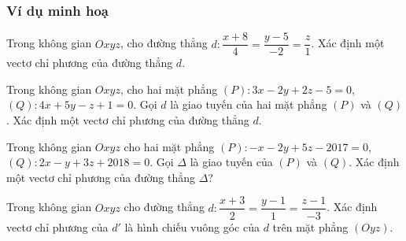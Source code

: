 	\subsubsection{Ví dụ minh hoạ}
	\begin{vd}%
	Trong không gian $Oxyz$, cho đường thẳng $d:\dfrac{x+8}{4}=\dfrac{y-5}{-2}=\dfrac{z}{1}$. Xác định một vectơ chỉ phương của đường thẳng $d$.
	\end{vd}
	\begin{vd}%
	Trong không gian $Oxyz$, cho hai mặt phẳng $(P): 3x-2y+2z-5=0$, $(Q): 4x+5y-z+1=0$. Gọi $ d $ là giao tuyến của hai mặt phẳng $(P)$ và $(Q)$. Xác định một vectơ chỉ phương của đường thẳng $d$.
	\end{vd}
	\begin{vd}%
	Trong không gian $Oxyz$ cho hai mặt phẳng $(P)\colon -x-2y+5z-2017=0$, $(Q)\colon 2x-y+3z+2018=0$. Gọi $\Delta$ là giao tuyến của $(P)$ và $(Q)$. Xác định một vectơ chỉ phương của đường thẳng $\Delta$?
	\end{vd}
	\begin{vd}%
	Trong không gian $Oxyz$ cho đường thẳng $d \colon \dfrac{x+3}{2} = \dfrac{y-1}{1}=\dfrac{z-1}{-3}$. Xác định vectơ chỉ phương của $ d' $ là hình chiếu vuông góc của $d$ trên mặt phẳng $(Oyz)$.
	\end{vd}
